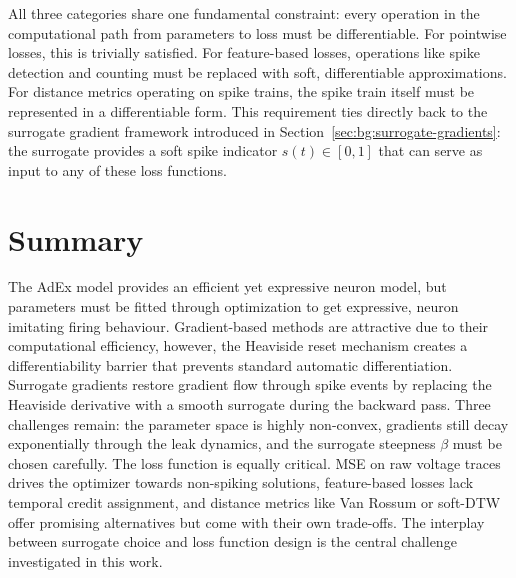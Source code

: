 All three categories share one fundamental constraint: every operation in the computational path from parameters to loss must be differentiable.
For pointwise losses, this is trivially satisfied.
For feature-based losses, operations like spike detection and counting must be replaced with soft, differentiable approximations.
For distance metrics operating on spike trains, the spike train itself must be represented in a differentiable form.
This requirement ties directly back to the surrogate gradient framework introduced in Section~\ref{sec:bg:surrogate-gradients}:
the surrogate provides a soft spike indicator $s(t) \in [0, 1]$ that can serve as input to any of these loss functions.

\section{Summary}\label{sec:bg:summary}
The AdEx model provides an efficient yet expressive neuron model, but parameters must be fitted through optimization to get expressive, neuron imitating firing behaviour.
Gradient-based methods are attractive due to their computational efficiency, however, the Heaviside reset mechanism creates a differentiability barrier that prevents standard automatic differentiation.
Surrogate gradients restore gradient flow through spike events by replacing the Heaviside derivative with a smooth surrogate during the backward pass.
Three challenges remain: the parameter space is highly non-convex, gradients still decay exponentially through the leak dynamics, and the surrogate steepness $\beta$ must be chosen carefully.
The loss function is equally critical.
MSE on raw voltage traces drives the optimizer towards non-spiking solutions, feature-based losses lack temporal credit assignment, and distance metrics like Van Rossum or soft-DTW offer promising alternatives but come with their own trade-offs.
The interplay between surrogate choice and loss function design is the central challenge investigated in this work.
